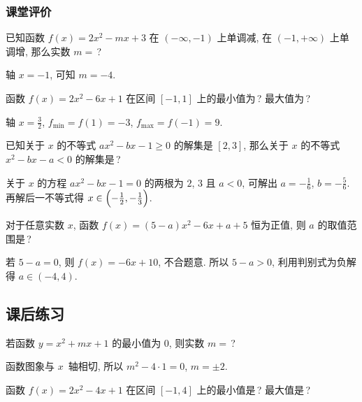   \subsubsection{课堂评价}
  \begin{exercise}
    已知函数 $f(x)=2x^2 -mx+3$ 在 $(-\infty ,-1)$ 上单调减, 
    在 $(-1,+\infty )$ 上单调增, 那么实数 $m=$\,?
  \end{exercise}

  \beginsolution
    轴 $x=-1$, 可知 $m=-4$.
  \endsolution
  
  \begin{exercise}
    函数 $f(x)=2x^2 -6x+1$ 在区间 $[-1,1]$ 上的最小值为\,? 最大值为\,?
  \end{exercise}

  \beginsolution
    轴 $x=\frac32$, $f_{\min}= f(1)=-3$, $f_{\max}= f(-1)=9$.
  \endsolution
  
  \begin{exercise}
    已知关于 $x$ 的不等式 $ax^2 -bx-1\geqslant 0$ 的解集是 $[2,3]$, 
    那么关于 $x$ 的不等式 $x^2 -bx-a<0$ 的解集是\,?
  \end{exercise}

  \beginsolution
    关于 $x$ 的方程 $ax^2 -bx-1=0$ 的两根为 $2$, $3$ 且 $a<0$, 可解出 $a=-\frac16$, $b=-\frac56$. 再解后一不等式得 $x\in\Bigl(-\frac12,-\frac13\Bigr)$.
  \endsolution
  
  \begin{exercise}
    对于任意实数 $x$, 函数 $f(x)=(5-a)x^2 -6x+a+5$ 恒为正值, 
    则 $a$ 的取值范围是\,?
  \end{exercise}

  \beginsolution
    若 $5-a=0$, 则 $f(x)=-6x+10$, 不合题意. 
    所以 $5-a>0$, 利用判别式为负解得 $a\in(-4,4)$.
  \endsolution
  
  \subsection{课后练习}
  \begin{exercise}
    若函数 $y=x^2 +mx+1$ 的最小值为 $0$, 则实数 $m=$\,?
  \end{exercise}

  \beginsolution
    函数图象与 $x$~轴相切, 所以 $m^2-4\cdot 1=0$, $m=\pm2$.
  \endsolution
  
  \begin{exercise}
    函数 $f(x)=2x^2 -4x+1$ 在区间 $[-1,4]$ 上的最小值是\,? 最大值是\,?
  \end{exercise}


